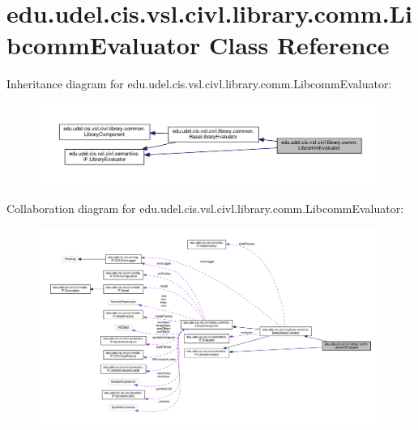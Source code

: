 \hypertarget{classedu_1_1udel_1_1cis_1_1vsl_1_1civl_1_1library_1_1comm_1_1LibcommEvaluator}{}\section{edu.\+udel.\+cis.\+vsl.\+civl.\+library.\+comm.\+Libcomm\+Evaluator Class Reference}
\label{classedu_1_1udel_1_1cis_1_1vsl_1_1civl_1_1library_1_1comm_1_1LibcommEvaluator}


Inheritance diagram for edu.\+udel.\+cis.\+vsl.\+civl.\+library.\+comm.\+Libcomm\+Evaluator\+:
\nopagebreak
\begin{figure}[H]
\begin{center}
\leavevmode
\includegraphics[width=350pt]{classedu_1_1udel_1_1cis_1_1vsl_1_1civl_1_1library_1_1comm_1_1LibcommEvaluator__inherit__graph}
\end{center}
\end{figure}


Collaboration diagram for edu.\+udel.\+cis.\+vsl.\+civl.\+library.\+comm.\+Libcomm\+Evaluator\+:
\nopagebreak
\begin{figure}[H]
\begin{center}
\leavevmode
\includegraphics[width=350pt]{classedu_1_1udel_1_1cis_1_1vsl_1_1civl_1_1library_1_1comm_1_1LibcommEvaluator__coll__graph}
\end{center}
\end{figure}
